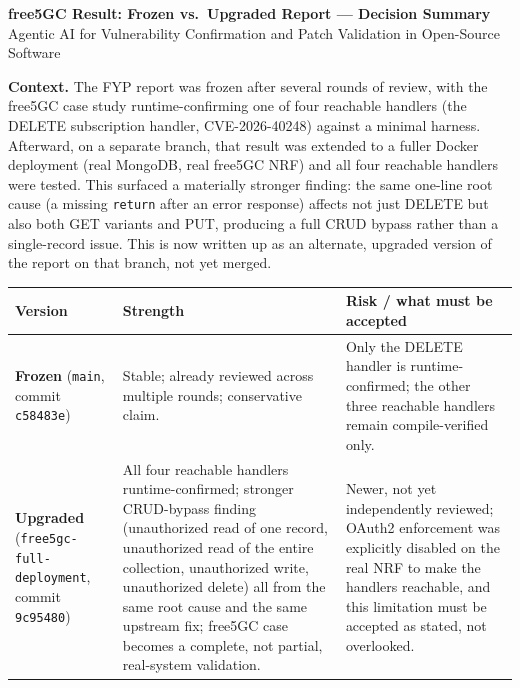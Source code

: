 \documentclass[11pt]{article}
\begin{document}
\begin{center}
{\Large \textbf{free5GC Result: Frozen vs.\ Upgraded Report --- Decision Summary}}\\[0.3em]
{\small Agentic AI for Vulnerability Confirmation and Patch Validation in Open-Source Software}
\end{center}

\vspace{0.5em}

\textbf{Context.} The FYP report was frozen after several rounds of review, with the free5GC case study runtime-confirming one of four reachable handlers (the DELETE subscription handler, CVE-2026-40248) against a minimal harness. Afterward, on a separate branch, that result was extended to a fuller Docker deployment (real MongoDB, real free5GC NRF) and all four reachable handlers were tested. This surfaced a materially stronger finding: the same one-line root cause (a missing \texttt{return} after an error response) affects not just DELETE but also both GET variants and PUT, producing a full CRUD bypass rather than a single-record issue. This is now written up as an alternate, upgraded version of the report on that branch, not yet merged.

\vspace{0.5em}

\begin{center}
\renewcommand{\arraystretch}{1.4}
\begin{tabular}{@{}p{2.7cm}p{5.7cm}p{5.7cm}@{}}
\toprule
\textbf{Version} & \textbf{Strength} & \textbf{Risk / what must be accepted} \\
\midrule
\textbf{Frozen} (\texttt{main}, commit \texttt{c58483e}) &
Stable; already reviewed across multiple rounds; conservative claim. &
Only the DELETE handler is runtime-confirmed; the other three reachable handlers remain compile-verified only. \\
\addlinespace
\textbf{Upgraded} (\texttt{free5gc-full-deployment}, commit \texttt{9c95480}) &
All four reachable handlers runtime-confirmed; stronger CRUD-bypass finding (unauthorized read of one record, unauthorized read of the entire collection, unauthorized write, unauthorized delete) all from the same root cause and the same upstream fix; free5GC case becomes a complete, not partial, real-system validation. &
Newer, not yet independently reviewed; OAuth2 enforcement was explicitly disabled on the real NRF to make the handlers reachable, and this limitation must be accepted as stated, not overlooked. \\
\bottomrule
\end{tabular}
\end{center}
\end{document}
